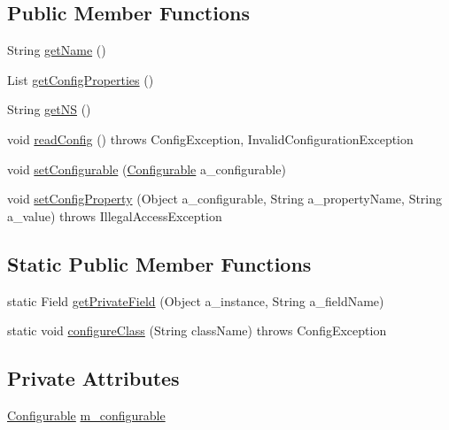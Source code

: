 \subsection*{Public Member Functions}
\begin{DoxyCompactItemize}
\item 
String \hyperlink{classorg_1_1jgap_1_1data_1_1config_1_1_root_configuration_handler_aae8e13674f79c02665def867f95f633f}{get\-Name} ()
\item 
List \hyperlink{classorg_1_1jgap_1_1data_1_1config_1_1_root_configuration_handler_a2ba39a7530f7b00ad252c18a4a7c13c3}{get\-Config\-Properties} ()
\item 
String \hyperlink{classorg_1_1jgap_1_1data_1_1config_1_1_root_configuration_handler_a3c79d1f7c1ccc36e27fe9f82a04c40f9}{get\-N\-S} ()
\item 
void \hyperlink{classorg_1_1jgap_1_1data_1_1config_1_1_root_configuration_handler_ade997372877bd63adeac47f2ebde995a}{read\-Config} ()  throws Config\-Exception, Invalid\-Configuration\-Exception 
\item 
void \hyperlink{classorg_1_1jgap_1_1data_1_1config_1_1_root_configuration_handler_a953d5e716d1029b3cdefed4f271ffa9a}{set\-Configurable} (\hyperlink{interfaceorg_1_1jgap_1_1data_1_1config_1_1_configurable}{Configurable} a\-\_\-configurable)
\item 
void \hyperlink{classorg_1_1jgap_1_1data_1_1config_1_1_root_configuration_handler_aae535baaf2667f1861137e89cdf0275e}{set\-Config\-Property} (Object a\-\_\-configurable, String a\-\_\-property\-Name, String a\-\_\-value)  throws Illegal\-Access\-Exception 
\end{DoxyCompactItemize}
\subsection*{Static Public Member Functions}
\begin{DoxyCompactItemize}
\item 
static Field \hyperlink{classorg_1_1jgap_1_1data_1_1config_1_1_root_configuration_handler_a40700244917cc560e5291cd7c0e40fda}{get\-Private\-Field} (Object a\-\_\-instance, String a\-\_\-field\-Name)
\item 
static void \hyperlink{classorg_1_1jgap_1_1data_1_1config_1_1_root_configuration_handler_a39c3887fe8ea96ee4b6af7a16de2b6b2}{configure\-Class} (String class\-Name)  throws Config\-Exception 
\end{DoxyCompactItemize}
\subsection*{Private Attributes}
\begin{DoxyCompactItemize}
\item 
\hyperlink{interfaceorg_1_1jgap_1_1data_1_1config_1_1_configurable}{Configurable} \hyperlink{classorg_1_1jgap_1_1data_1_1config_1_1_root_configuration_handler_a002b9a34f2fdf33648eb5f341a1816fa}{m\-\_\-configurable}
\end{DoxyCompactItemize}
